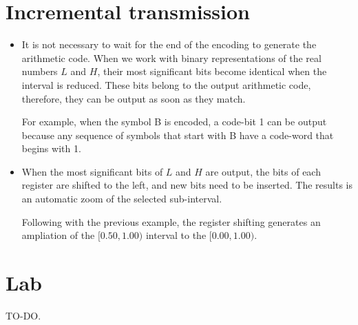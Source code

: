 \section{Incremental transmission}
\begin{itemize}
\item
  It is not necessary to wait for the end of the encoding to generate
  the arithmetic code. When we work with binary representations of the
  real numbers \(L\) and \(H\), their most significant bits become
  identical when the interval is reduced. These bits belong to the
  output arithmetic code, therefore, they can be output as soon as they
  match.

  For example, when the symbol B is encoded, a code-bit 1 can be output
  because any sequence of symbols that start with B have a code-word
  that begins with 1.
\item
  When the most significant bits of \(L\) and \(H\) are output, the bits
  of each register are shifted to the left, and new bits need to be
  inserted. The results is an automatic zoom of the selected
  sub-interval.

  Following with the previous example, the register shifting generates
  an ampliation of the \([0.50,1.00)\) interval to the \([0.00,1.00)\).
\end{itemize}

\section{Lab}

TO-DO.


